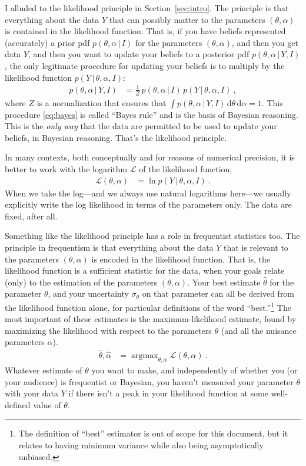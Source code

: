 \documentclass{article}
\newcommand{\sectionname}{Section}
\newcommand{\secref}[1]{\sectionname~\ref{#1}}
\newcommand{\dd}{\mathrm{d}}
\newcommand{\given}{\,|\,}
\DeclareMathOperator*{\argmax}{argmax}
\begin{document}
I alluded to the likelihood principle in \secref{sec:intro}.
The principle is that everything about the data $Y$ that can possibly matter to the parameters $(\theta,\alpha)$ is contained in the likelihood function.
That is, if you have beliefs represented (accurately) a prior pdf $p(\theta,\alpha\given I)$ for the parameters $(\theta,\alpha)$,
and then you get data $Y$,
and then you want to update your beliefs to a posterior pdf $p(\theta,\alpha\given Y,I)$, the only legitimate procedure for updating your beliefs is to multiply by the likelihood function $p(Y\given\theta,\alpha,I)$:
\begin{align}
    p(\theta,\alpha\given Y,I) &= \frac{1}{Z}\,p(\theta,\alpha\given I)\,p(Y\given\theta,\alpha,I) ~,\label{eq:bayes}
\end{align}
where $Z$ is a normalization that ensures that $\int p(\theta,\alpha\given Y,I)\,\dd\theta\,\dd\alpha=1$.
This procedure \eqref{eq:bayes} is called ``Bayes rule'' and is the basis of Bayesian reasoning.
This is the \emph{only way} that the data are permitted to be used to update your beliefs, in Bayesian reasoning.
That's the likelihood principle.

In many contexts, both conceptually and for reasons of numerical precision, it is better to work with the logarithm $\mathscr{L}$ of the likelihood function;
\begin{align}
    \mathscr{L}(\theta,\alpha) &= \ln p(Y\given\theta,\alpha,I) ~.
\end{align}
When we take the log---and we always use natural logarithms here---we usually explicitly write the log likelihood in terms of the parameters only.
The data are fixed, after all.

Something like the likelihood principle has a role in frequentist statistics too.
The principle in frequentism is that everything about the data $Y$ that is relevant to the parameters $(\theta,\alpha)$ is encoded in the likelihood function.
That is, the likelihood function is a sufficient statistic for the data, when your goals relate (only) to the estimation of the parameters $(\theta,\alpha)$.
Your best estimate $\hat{\theta}$ for the parameter $\theta$, and your uncertainty $\sigma_\theta$ on that parameter can all be derived from the likelihood function alone, for particular definitions of the word ``best.''\footnote{%
The definition of ``best'' estimator is out of scope for this document, but it relates to having minimum variance while also being asymptotically unbiased.}
The most important of these estimates is the maximum-likelihood estimate, found by maximizing the likelihood with respect to the parameters $\theta$ (and all the nuisance parameters $\alpha$).
\begin{align}
    \hat{\theta},\hat{\alpha} &= \argmax_{\theta,\alpha} \mathscr{L}(\theta,\alpha) ~.\label{eq:ML}
\end{align}
Whatever estimate of $\theta$ you want to make, and independently of whether you (or your audience) is frequentist or Bayesian, you haven't measured your parameter $\theta$ with your data $Y$ if there isn't a peak in your likelihood function at some well-defined value of $\theta$.
\end{document}
